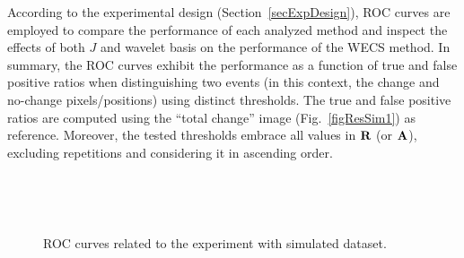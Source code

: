 \documentclass[journal]{IEEEtran}
\newcommand{\vA}{{\textbf A}}
\newcommand{\vR}{{\textbf R}}
\begin{document}
According to the experimental design (Section~\ref{secExpDesign}), ROC curves are employed to compare the performance of each analyzed method and inspect the effects of both $J$ and wavelet basis on the performance of the WECS method. In summary, the ROC curves exhibit the performance as a function of true and false positive ratios when distinguishing two events (in this context, the change and no-change pixels/positions) using distinct thresholds. The true and false positive ratios are computed using the ``total change'' image (Fig.~\ref{figResSim1}) as reference. Moreover, the tested thresholds embrace all values in $\vR$ (or $\vA$), excluding repetitions and considering it in ascending order.



\begin{figure}[hbt]
\centering

\mbox{
 \quad
{}
}

\mbox{
}

\caption{ROC curves related to the experiment with simulated dataset.}\label{F:EllipsoidChanges_details}
\end{figure}
\end{document}
